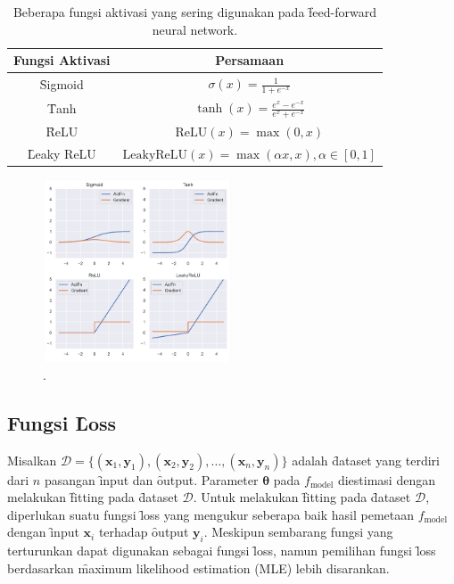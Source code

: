     \begin{table}
        \centering
        \caption{Beberapa fungsi aktivasi yang sering digunakan pada \f{feed-forward neural network}.}
        \label{tab:activation-function}
        \begin{tabular}{|c|c|}
            \hline
            \textbf{Fungsi Aktivasi} & \textbf{Persamaan} \\
            \hline
            \hline
            \f{Sigmoid} & $\sigma(x) = \frac{1}{1 + e^{-x}}$ \\
            \hline
            \f{Tanh} & $\tanh(x) = \frac{e^x - e^{-x}}{e^x + e^{-x}}$ \\
            \hline
            \f{ReLU} & $\text{ReLU}(x) = \max(0, x)$ \\
            \hline
            \f{Leaky ReLU} & $\text{LeakyReLU}(x) = \max(\alpha x, x), \alpha \in [0, 1]$ \\
            \hline
        \end{tabular}
    \end{table}
    
    \begin{figure}
        \centering
        \includegraphics[width=0.50\textwidth]{assets/pics/act_function.png}
        \caption{\license.}
        \label{fig:activation-function}
    \end{figure}


    \subsection{Fungsi \f{Loss}}
    Misalkan $\mathcal{D} = \{(\mathbf{x}_1, \mathbf{y}_1), (\mathbf{x}_2, \mathbf{y}_2), \dots, (\mathbf{x}_n, \mathbf{y}_n)\}$ adalah \f{dataset} yang terdiri dari $n$ pasangan \f{input} dan \f{output}. Parameter $\bm{\theta}$ pada $f_{\text{model}}$ diestimasi dengan melakukan \f{fitting} pada \f{dataset} $\mathcal{D}$. Untuk melakukan \f{fitting} pada \f{dataset} $\mathcal{D}$, diperlukan suatu fungsi \f{loss} yang mengukur seberapa baik hasil pemetaan $f_{\text{model}}$ dengan \f{input} $\mathbf{x}_i$ terhadap \f{output} $\mathbf{y}_i$. Meskipun sembarang fungsi yang terturunkan dapat digunakan sebagai fungsi \f{loss}, namun pemilihan fungsi \f{loss} berdasarkan \f{maximum likelihood estimation} (MLE) lebih disarankan. 
    
